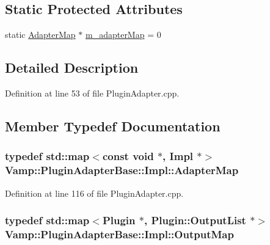 \subsection*{Static Protected Attributes}
\begin{DoxyCompactItemize}
\item 
static \hyperlink{class_vamp_1_1_plugin_adapter_base_1_1_impl_a6c8f2c8fce370d586785353c939601d5}{Adapter\+Map} $\ast$ \hyperlink{class_vamp_1_1_plugin_adapter_base_1_1_impl_a3526d127572dd900de260ac90433d062}{m\+\_\+adapter\+Map} = 0
\end{DoxyCompactItemize}


\subsection{Detailed Description}


Definition at line 53 of file Plugin\+Adapter.\+cpp.



\subsection{Member Typedef Documentation}
\subsubsection[{\texorpdfstring{Adapter\+Map}{AdapterMap}}]{\setlength{\rightskip}{0pt plus 5cm}typedef {\bf std\+::map}$<${\bf const} {\bf void} $\ast$, {\bf Impl} $\ast$$>$ {\bf Vamp\+::\+Plugin\+Adapter\+Base\+::\+Impl\+::\+Adapter\+Map}\hspace{0.3cm}{\ttfamily [protected]}}\hypertarget{class_vamp_1_1_plugin_adapter_base_1_1_impl_a6c8f2c8fce370d586785353c939601d5}{}\label{class_vamp_1_1_plugin_adapter_base_1_1_impl_a6c8f2c8fce370d586785353c939601d5}


Definition at line 116 of file Plugin\+Adapter.\+cpp.

\subsubsection[{\texorpdfstring{Output\+Map}{OutputMap}}]{\setlength{\rightskip}{0pt plus 5cm}typedef {\bf std\+::map}$<${\bf Plugin} $\ast$, {\bf Plugin\+::\+Output\+List} $\ast$$>$ {\bf Vamp\+::\+Plugin\+Adapter\+Base\+::\+Impl\+::\+Output\+Map}\hspace{0.3cm}{\ttfamily [protected]}}\hypertarget{class_vamp_1_1_plugin_adapter_base_1_1_impl_afd448b66d5973d8e14ec592dabcbbd2d}{}\label{class_vamp_1_1_plugin_adapter_base_1_1_impl_afd448b66d5973d8e14ec592dabcbbd2d}


